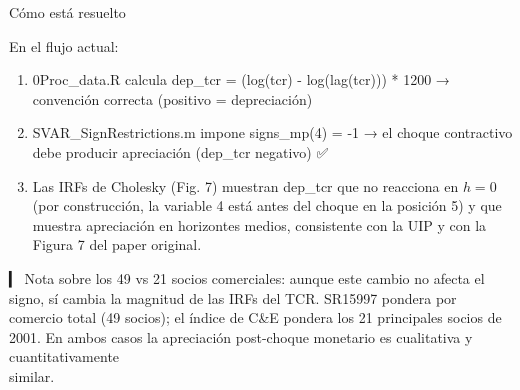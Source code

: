 \documentclass[
]{article}
\providecommand{\tightlist}{%
  \setlength{\itemsep}{0pt}\setlength{\parskip}{0pt}}
\begin{document}
Cómo está resuelto

En el flujo actual:

\begin{enumerate}
\def\labelenumi{\arabic{enumi}.}
\tightlist
\item
  0Proc\_data.R calcula dep\_tcr = (log(tcr) - log(lag(tcr))) * 1200 →
  convención correcta (positivo = depreciación)
\item
  SVAR\_SignRestrictions.m impone signs\_mp(4) = -1 → el choque
  contractivo debe producir apreciación (dep\_tcr negativo) ✅
\item
  Las IRFs de Cholesky (Fig. 7) muestran dep\_tcr que no reacciona en
  \(h=0\) (por construcción, la variable 4 está antes del choque en la
  posición 5) y que muestra apreciación en horizontes medios,
  consistente con la UIP y con la Figura 7 del paper original.
\end{enumerate}

▎ Nota sobre los 49 vs 21 socios comerciales: aunque este cambio no
afecta el signo, sí cambia la magnitud de las IRFs del TCR. SR15997
pondera por comercio total (49 socios); el índice de C\&E pondera los 21
principales socios de 2001. En ambos casos la apreciación post-choque
monetario es cualitativa y cuantitativamente\\
similar.
\end{document}
